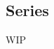 \documentclass[../poma-notes.tex]{subfiles}
\begin{document}
\subsection*{Series}

WIP
\end{document}
